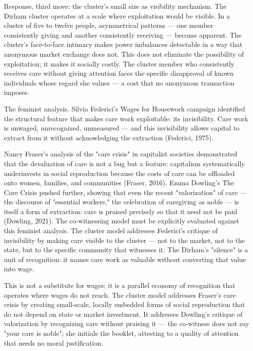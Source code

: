 Response, third move: the cluster's small size as visibility mechanism. The Dirham cluster operates at a scale where exploitation would be visible. In a cluster of five to twelve people, asymmetrical patterns — one member consistently giving and another consistently receiving — become apparent. The cluster's face-to-face intimacy makes power imbalances detectable in a way that anonymous market exchange does not. This does not eliminate the possibility of exploitation; it makes it socially costly. The cluster member who consistently receives care without giving attention faces the specific disapproval of known individuals whose regard she values — a cost that no anonymous transaction imposes.

The feminist analysis. Silvia Federici's Wages for Housework campaign identified the structural feature that makes care work exploitable: its invisibility. Care work is unwaged, unrecognized, unmeasured — and this invisibility allows capital to extract from it without acknowledging the extraction (Federici, 1975).

Nancy Fraser's analysis of the "care crisis" in capitalist societies demonstrated that the devaluation of care is not a bug but a feature: capitalism systematically underinvests in social reproduction because the costs of care can be offloaded onto women, families, and communities (Fraser, 2016). Emma Dowling's The Care Crisis pushed further, showing that even the recent "valorization" of care — the discourse of "essential workers," the celebration of caregiving as noble — is itself a form of extraction: care is praised precisely so that it need not be paid (Dowling, 2021). The co-witnessing model must be explicitly evaluated against this feminist analysis. The cluster model addresses Federici's critique of invisibility by making care visible to the cluster — not to the market, not to the state, but to the specific community that witnesses it. The Dirham's "silence" is a unit of recognition: it names care work as valuable without converting that value into wage.

This is not a substitute for wages; it is a parallel economy of recognition that operates where wages do not reach. The cluster model addresses Fraser's care crisis by creating small-scale, locally embedded forms of social reproduction that do not depend on state or market investment. It addresses Dowling's critique of valorization by recognizing care without praising it — the co-witness does not say "your care is noble"; she initials the booklet, attesting to a quality of attention that needs no moral justification.

